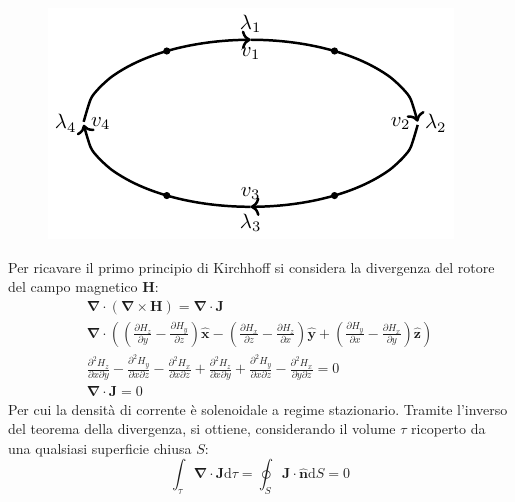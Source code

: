 \documentclass{article}
\newcommand{\vect}[1]{\boldsymbol{\mathbf{#1}}}
\newcommand{\df}{\mathrm{d}}
\numberwithin{equation}{subsection}
\begin{document}
\begin{figure}[H]%
    \centering
    \includegraphics{principio-kirchhoff-tensioni.pdf}%
    \label{fig:principio-kirchhoff-tensioni}
\end{figure}

Per ricavare il primo principio di Kirchhoff si considera la divergenza del rotore del campo magnetico $\vect{H}$:
\begin{gather*}
    \vect\nabla\cdot(\vect\nabla\times\vect{H})=\vect\nabla\cdot\vect{J}\\
    \displaystyle\vect\nabla\cdot\left(\displaystyle\left(\frac{\partial H_z}{\partial y}-\frac{\partial H_y}{\partial z}\right)\hat{\vect{x}}-\left(\frac{\partial H_x}{\partial z}-\frac{\partial H_z}{\partial x}\right)\hat{\vect{y}}+\left(\frac{\partial H_y}{\partial x}-\frac{\partial H_x}{\partial y}\right)\hat{\vect{z}}\right)\\
    \displaystyle\frac{\partial^2H_z}{\partial x\partial y}-\frac{\partial^2H_y}{\partial x\partial z}-\frac{\partial^2H_x}{\partial x\partial z}+\frac{\partial^2H_z}{\partial x\partial y}+\frac{\partial^2 H_y}{\partial x\partial z}-\frac{\partial^2H_x}{\partial y\partial z}=0\\
    \vect\nabla\cdot\vect{J}=0
\end{gather*}
Per cui la densità di corrente è solenoidale a regime stazionario. Tramite l'inverso del teorema della divergenza, si ottiene, considerando il volume $\tau$ ricoperto da una 
qualsiasi superficie chiusa $S$:
\begin{equation*}
    \displaystyle\int_{\tau}\vect\nabla\cdot\vect{J}\df\tau=\oint_{S}\vect{J}\cdot\hat{\vect{n}}\df S=0
\end{equation*}
\end{document}
